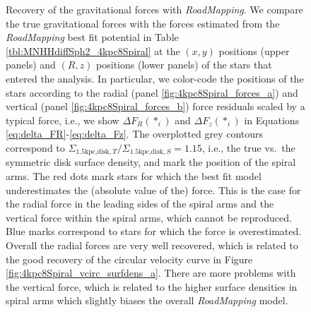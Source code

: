 \documentclass[iop,revtex4,numberedappendix,appendixfloats]{emulateapj}
\newcommand{\RM}{{\sl RoadMapping}}
\begin{document}
\begin{figure}[!htbp]
\centering
\caption{Recovery of the gravitational forces with \RM{}. We compare the true gravitational forces with the forces estimated from the \RM{} best fit potential in Table \ref{tbl:MNHHdiffSph2_4kpc8Spiral} at the $(x,y)$ positions (upper panels) and $(R,z)$ positions (lower panels) of the stars that entered the analysis. In particular, we color-code the positions of the stars according to the radial (panel \ref{fig:4kpc8Spiral_forces_a}) and vertical (panel \ref{fig:4kpc8Spiral_forces_b}) force residuals scaled by a typical force, i.e., we show $\Delta F_R(*_i)$ and $\Delta F_z(*_i)$ in Equations \eqref{eq:delta_FR}-\eqref{eq:delta_Fz}. The overplotted grey contours correspond to $\Sigma_{\text{1.5kpc,disk},T}/\Sigma_{\text{1.5kpc,disk},S}=1.15$, i.e., the true vs.\ the symmetric disk surface density, and mark the position of the spiral arms. The red dots mark stars for which the best fit model underestimates the (absolute value of the) force. This is the case for the radial force in the leading sides of the spiral arms and the vertical force within the spiral arms, which cannot be reproduced. Blue marks correspond to stars for which the force is overestimated. Overall the radial forces are very well recovered, which is related to the good recovery of the circular velocity curve in Figure \ref{fig:4kpc8Spiral_vcirc_surfdens_a}. There are more problems with the vertical force, which is related to the higher surface densities in spiral arms which slightly biases the overall \RM{} model.}

\end{figure}
\end{document}
